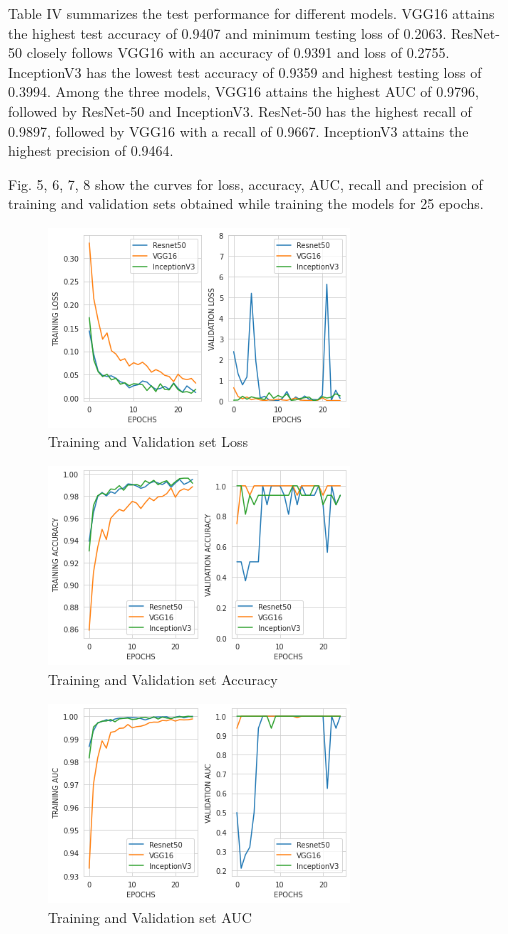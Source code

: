 \documentclass[conference]{IEEEtran}
\begin{document}
Table IV summarizes the test performance for different models. VGG16  attains the highest test accuracy of 0.9407 and minimum testing loss of 0.2063. ResNet-50 closely follows VGG16 with an accuracy of 0.9391 and loss of 0.2755. InceptionV3  has the lowest test accuracy of 0.9359 and highest testing loss of 0.3994. Among the three models, VGG16 attains the highest AUC of 0.9796, followed by ResNet-50 and InceptionV3. ResNet-50 has the highest recall of 0.9897, followed by VGG16 with a recall of 0.9667. InceptionV3 attains the highest precision of 0.9464.

Fig. 5, 6, 7, 8 show the curves for loss, accuracy, AUC, recall and precision of training and validation sets obtained while training the models for 25 epochs.

\begin{figure}
\centering
 \vspace{\floatsep}
\includegraphics[width=8cm]{loss.png}
\caption{Training and Validation set Loss}
\label{fig:cenario}
\end{figure}
\begin{figure}
\centering
 \vspace{\floatsep}
\includegraphics[width=8cm]{accuracy.png}
\caption{Training and Validation set Accuracy}
\label{fig:cenario}
\end{figure}
\begin{figure}
\centering
 \vspace{\floatsep}
\includegraphics[width=8cm]{auc.png}
\caption{Training and Validation set AUC}
\label{fig:cenario}
\end{figure}
\end{document}
